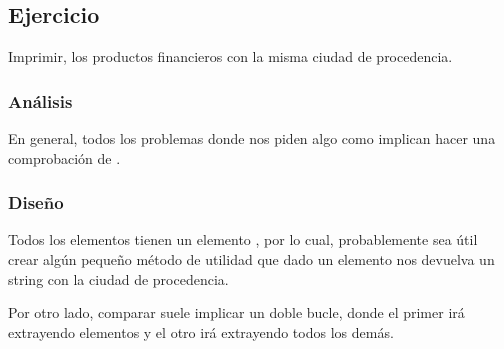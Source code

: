 \documentclass[letterpaper,10pt,spanish]{sphinxmanual}
\begin{document}
\begin{sphinxVerbatim}[commandchars=\\\{\}]
                  
                         


\end{sphinxVerbatim}


\subsection{Ejercicio}
\label{\detokenize{tema6:id10}}
Imprimir, los productos financieros con la misma ciudad de procedencia.


\subsubsection{Análisis}
\label{\detokenize{tema6:id11}}
En general, todos los problemas donde nos piden algo como  implican hacer una comprobación de .


\subsubsection{Diseño}
\label{\detokenize{tema6:id12}}
Todos los elementos tienen un elemento , por lo cual, probablemente sea útil crear algún pequeño método de utilidad que dado un elemento nos devuelva un string con la ciudad de procedencia.

Por otro lado, comparar  suele implicar un doble bucle, donde el primer irá extrayendo elementos y el otro irá extrayendo todos los demás.
\end{document}
